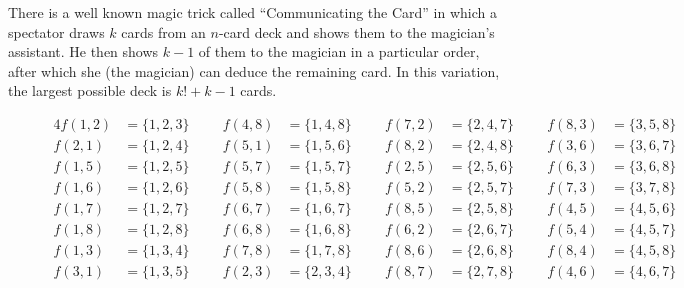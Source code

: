 \documentclass{article}
\begin{document}
  There is a well known magic trick called ``Communicating the Card'' in which
  a spectator draws $k$ cards from an $n$-card deck and shows them to the
  magician's assistant. He then shows $k-1$ of them to the magician
  in a particular order, after which she (the magician) can deduce the remaining
  card. In this variation, the largest possible deck is $k! + k - 1$ cards.
\begin{figure}[!h]
  \centering
  \begin{alignat*}{4}
    f(1,2) &= \{1,2,3\} \hspace{1cm} f(4,8) &= \{1,4,8\} \hspace{1cm} f(7,2) &= \{2,4,7\} \hspace{1cm} f(8,3) &= \{3,5,8\}\\
    f(2,1) &= \{1,2,4\} \hspace{1cm} f(5,1) &= \{1,5,6\} \hspace{1cm} f(8,2) &= \{2,4,8\} \hspace{1cm} f(3,6) &= \{3,6,7\}\\
    f(1,5) &= \{1,2,5\} \hspace{1cm} f(5,7) &= \{1,5,7\} \hspace{1cm} f(2,5) &= \{2,5,6\} \hspace{1cm} f(6,3) &= \{3,6,8\}\\
    f(1,6) &= \{1,2,6\} \hspace{1cm} f(5,8) &= \{1,5,8\} \hspace{1cm} f(5,2) &= \{2,5,7\} \hspace{1cm} f(7,3) &= \{3,7,8\}\\
    f(1,7) &= \{1,2,7\} \hspace{1cm} f(6,7) &= \{1,6,7\} \hspace{1cm} f(8,5) &= \{2,5,8\} \hspace{1cm} f(4,5) &= \{4,5,6\}\\
    f(1,8) &= \{1,2,8\} \hspace{1cm} f(6,8) &= \{1,6,8\} \hspace{1cm} f(6,2) &= \{2,6,7\} \hspace{1cm} f(5,4) &= \{4,5,7\}\\
    f(1,3) &= \{1,3,4\} \hspace{1cm} f(7,8) &= \{1,7,8\} \hspace{1cm} f(8,6) &= \{2,6,8\} \hspace{1cm} f(8,4) &= \{4,5,8\}\\
    f(3,1) &= \{1,3,5\} \hspace{1cm} f(2,3) &= \{2,3,4\} \hspace{1cm} f(8,7) &= \{2,7,8\} \hspace{1cm} f(4,6) &= \{4,6,7\}\\

\end{alignat*}
\end{figure}
\end{document}
